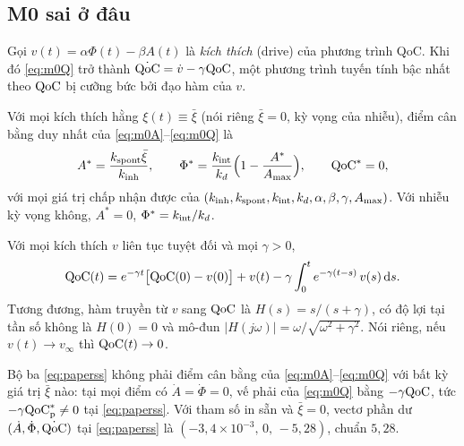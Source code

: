 \subsection{M0 sai ở đâu}
\label{sec:m0wrong}

Gọi $v(t)=\alpha\Phi(t)-\beta A(t)$ là \emph{kích thích} (drive) của phương trình QoC. Khi đó \eqref{eq:m0Q} trở thành $\dot{\mathrm{QoC}}=\dot v-\gamma\mathrm{QoC}$, một phương trình tuyến tính bậc nhất theo $\mathrm{QoC}$ bị cưỡng bức bởi đạo hàm của $v$.

\begin{proposition}
\label{prop:p1}
Với mọi kích thích hằng $\xi(t)\equiv\bar\xi$ (nói riêng $\bar\xi=0$, kỳ vọng của nhiễu), điểm cân bằng duy nhất của \eqref{eq:m0A}--\eqref{eq:m0Q} là
\begin{equation}
  A^*=\frac{k_{\mathrm{spont}}\bar\xi}{k_{\mathrm{inh}}},\qquad \Phi^*=\frac{k_{\mathrm{int}}}{k_{d}}\Bigl(1-\frac{A^*}{A_{\max}}\Bigr),\qquad \mathrm{QoC}^*=0,
  \label{eq:m0ss}
\end{equation}
với mọi giá trị chấp nhận được của $(k_{\mathrm{inh}},k_{\mathrm{spont}},k_{\mathrm{int}},k_{d},\alpha,\beta,\gamma,A_{\max})$. Với nhiễu kỳ vọng không, $A^*=0$, $\Phi^*=k_{\mathrm{int}}/k_{d}$.
\end{proposition}

\begin{proposition}
\label{prop:p2}
Với mọi kích thích $v$ liên tục tuyệt đối và mọi $\gamma>0$,
\begin{equation}
  \mathrm{QoC}(t)=e^{-\gamma t}\bigl[\mathrm{QoC}(0)-v(0)\bigr]+v(t)-\gamma\int_0^t e^{-\gamma(t-s)}\,v(s)\,\mathrm{d} s .
  \label{eq:qocsol}
\end{equation}
Tương đương, hàm truyền từ $v$ sang $\mathrm{QoC}$ là $H(s)=s/(s+\gamma)$, có độ lợi tại tần số không là $H(0)=0$ và mô-đun $|H(j\omega)|=\omega/\sqrt{\omega^2+\gamma^2}$. Nói riêng, nếu $v(t)\to v_\infty$ thì $\mathrm{QoC}(t)\to 0$.
\end{proposition}

\begin{proposition}
\label{prop:p3}
Bộ ba \eqref{eq:paperss} không phải điểm cân bằng của \eqref{eq:m0A}--\eqref{eq:m0Q} với bất kỳ giá trị $\bar\xi$ nào: tại mọi điểm có $\dot A=\dot\Phi=0$, vế phải của \eqref{eq:m0Q} bằng $-\gamma\mathrm{QoC}$, tức $-\gamma\mathrm{QoC}^*_{\mathrm p}\neq 0$ tại \eqref{eq:paperss}. Với tham số in sẵn và $\bar\xi=0$, vectơ phần dư $(\dot A,\dot\Phi,\dot{\mathrm{QoC}})$ tại \eqref{eq:paperss} là $(-3{,}4\times10^{-3},\,0,\,-5{,}28)$, chuẩn $5{,}28$.
\end{proposition}

